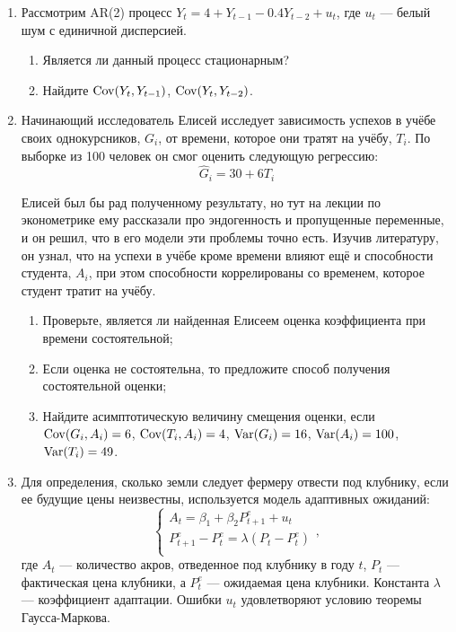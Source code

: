 \documentclass[12pt, a4paper]{article}
\begin{document}
\begin{enumerate}

\item Рассмотрим AR(2) процесс $Y_t = 4 + Y_{t-1} - 0.4 Y_{t-2} + u_t$, где $u_t$ — белый шум с единичной дисперсией.
\begin{enumerate}
\item Является ли данный процесс стационарным?
\item Найдите $\operatorname{Cov}(Y_t, Y_{t-1})$, $\operatorname{Cov}(Y_t, Y_{t-2})$.
\end{enumerate}


\item Начинающий исследователь Елисей исследует зависимость успехов в учёбе своих однокурсников, $G_i$, от времени, которое они тратят на учёбу, $T_i$. По выборке из 100 человек он смог оценить следующую регрессию:
\[
\hat G_i = 30 + 6T_i
\]

Елисей был бы рад полученному результату, но тут на лекции по эконометрике ему рассказали про эндогенность и пропущенные переменные, и он решил, что в его модели эти проблемы точно есть. Изучив литературу, он узнал, что на успехи в учёбе кроме времени влияют ещё и способности студента, $A_i$, при этом способности коррелированы со временем, которое студент тратит на учёбу.

\begin{enumerate}
\item Проверьте, является ли найденная Елисеем оценка коэффициента при времени состоятельной;
\item Если оценка не состоятельна, то предложите способ получения состоятельной оценки;
\item Найдите асимптотическую величину смещения оценки, если $\operatorname{Cov}(G_i, A_i) = 6$,
$\operatorname{Cov}(T_i, A_i) = 4$, $\operatorname{Var}(G_i) = 16$, $\operatorname{Var}(A_i) = 100$, $\operatorname{Var}(T_i) = 49$.
\end{enumerate}


\item Для определения, сколько земли следует фермеру отвести под клубнику, если ее будущие цены неизвестны, используется  модель адаптивных ожиданий:
\[
\begin{cases}
A_t = \beta_1 + \beta_2 P_{t+1}^e + u_t \\
P_{t+1}^e - P_{t}^e = \lambda (P_t - P_t^e) \\
\end{cases},
\]
где $A_t$ — количество акров, отведенное под клубнику в году $t$, $P_t$ — фактическая цена клубники, а $P_t^e$ — ожидаемая цена клубники. Константа $\lambda$ — коэффициент адаптации. Ошибки $u_t$ удовлетворяют условию теоремы Гаусса-Маркова.


\end{enumerate}
\end{document}
